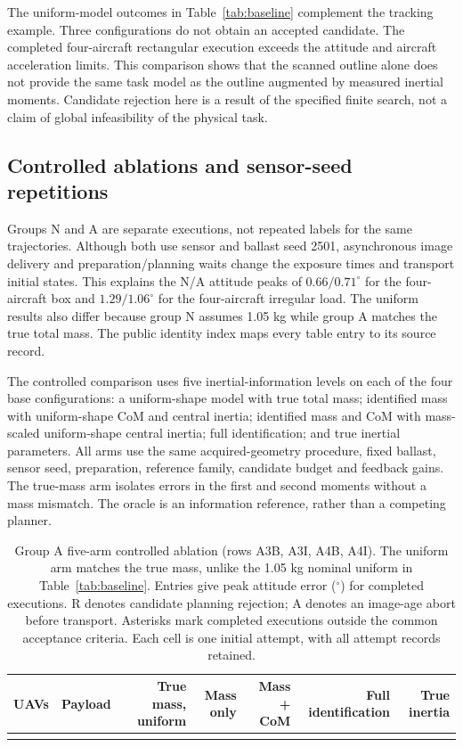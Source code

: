 The uniform-model outcomes in Table~\ref{tab:baseline} complement the tracking example. Three configurations do not obtain an accepted candidate. The completed four-aircraft rectangular execution exceeds the attitude and aircraft acceleration limits. This comparison shows that the scanned outline alone does not provide the same task model as the outline augmented by measured inertial moments. Candidate rejection here is a result of the specified finite search, not a claim of global infeasibility of the physical task.

\subsection{Controlled ablations and sensor-seed repetitions}
Groups N and A are separate executions, not repeated labels for the same trajectories. Although both use sensor and ballast seed 2501, asynchronous image delivery and preparation/planning waits change the exposure times and transport initial states. This explains the N/A attitude peaks of $0.66/0.71^\circ$ for the four-aircraft box and $1.29/1.06^\circ$ for the four-aircraft irregular load. The uniform results also differ because group N assumes 1.05 kg while group A matches the true total mass. The public identity index maps every table entry to its source record.

The controlled comparison uses five inertial-information levels on each of the four base configurations: a uniform-shape model with true total mass; identified mass with uniform-shape CoM and central inertia; identified mass and CoM with mass-scaled uniform-shape central inertia; full identification; and true inertial parameters. All arms use the same acquired-geometry procedure, fixed ballast, sensor seed, preparation, reference family, candidate budget and feedback gains. The true-mass arm isolates errors in the first and second moments without a mass mismatch. The oracle is an information reference, rather than a competing planner.

\begin{table}[t]
\centering\small
\caption{Group A five-arm controlled ablation (rows A3B, A3I, A4B, A4I). The uniform arm matches the true mass, unlike the 1.05 kg nominal uniform in Table~\ref{tab:baseline}. Entries give peak attitude error ($^\circ$) for completed executions. R denotes candidate planning rejection; A denotes an image-age abort before transport. Asterisks mark completed executions outside the common acceptance criteria. Each cell is one initial attempt, with all attempt records retained.}
\label{tab:ablation}
\begin{tabular}{@{}clrrrrr@{}}\toprule
UAVs & Payload & True mass, uniform & Mass only & Mass + CoM & Full identification & True inertia\\\midrule
\\
\bottomrule\end{tabular}
\end{table}

